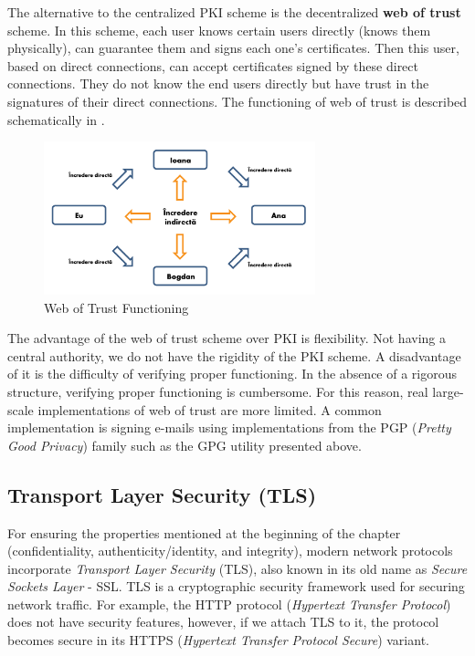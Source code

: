 The alternative to the centralized PKI scheme is the decentralized \textbf{web of trust} scheme.
In this scheme, each user knows certain users directly (knows them physically), can guarantee them and signs each one's certificates.
Then this user, based on direct connections, can accept certificates signed by these direct connections.
They do not know the end users directly but have trust in the signatures of their direct connections.
The functioning of web of trust is described schematically in .

\begin{figure}[htbp]
  \centering
  \def\svgwidth{\columnwidth}
  \includegraphics[width=0.7\textwidth]{chapters/12-auth/img/web-of-trust.svg.pdf}
  \caption{Web of Trust Functioning}
  \label{fig:sec:web-of-trust}
\end{figure}

The advantage of the web of trust scheme over PKI is flexibility.
Not having a central authority, we do not have the rigidity of the PKI scheme.
A disadvantage of it is the difficulty of verifying proper functioning.
In the absence of a rigorous structure, verifying proper functioning is cumbersome.
For this reason, real large-scale implementations of web of trust are more limited.
A common implementation is signing e-mails using implementations from the PGP  (\textit{Pretty Good Privacy}) family such as the GPG utility presented above.

\subsection{Transport Layer Security (TLS)}
\label{sec:sec:transfer:tls}

For ensuring the properties mentioned at the beginning of the chapter (confidentiality, authenticity/identity, and integrity), modern network protocols incorporate \textit{Transport Layer Security} (TLS), also known in its old name as \textit{Secure Sockets Layer} - SSL.
TLS is a cryptographic security framework used for securing network traffic.
For example, the HTTP protocol (\textit{Hypertext Transfer Protocol}) does not have security features, however, if we attach TLS to it, the protocol becomes secure in its HTTPS  (\textit{Hypertext Transfer Protocol Secure}) variant.


